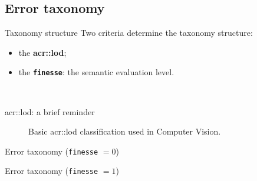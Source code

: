 \documentclass[10pt, export]{beamer}
\begin{document}
            \subsection{Error taxonomy}
            \begin{frame}{Taxonomy structure}
                Two criteria determine the taxonomy structure:
                \begin{itemize}[label=$\blacktriangleright$, font=\color{IGNGreen}, itemsep=2em]
                    \item<2-> the \textbf{\acrfull{acr::lod}};
                    \item<3-> the \textbf{\texttt{finesse}}: the semantic evaluation level.
                \end{itemize}
                ~\\
            \end{frame}
            \begin{frame}{\acrshort{acr::lod}: a brief reminder}
                \begin{figure}
                    \begin{center}
                        
                    \end{center}
                    \caption{Basic \acrshort{acr::lod} classification used in Computer Vision.}
                \end{figure}
            \end{frame}    
            \begin{frame}{Error taxonomy (\texttt{finesse} $= 0$)}
                \begin{figure}
                    
                \end{figure}
            \end{frame}
            \begin{frame}{Error taxonomy (\texttt{finesse} $= 1$)}
                \begin{figure}
                    
                \end{figure}
            \end{frame}
\end{document}
